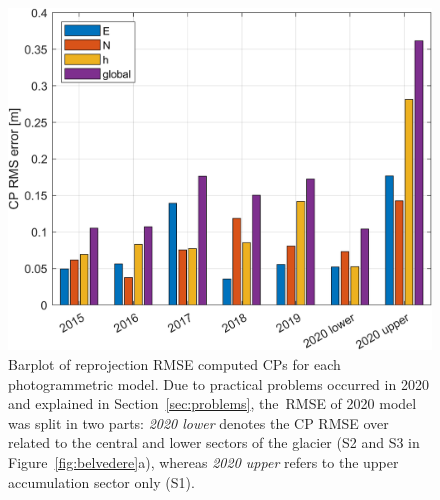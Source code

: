 \begin{figure}
	\centering
	\includegraphics[width=0.7\columnwidth]{figures/chapter3/CPrmse.png}
	\caption{Barplot of reprojection RMSE computed CPs for each photogrammetric model. Due to practical problems occurred in 2020 and explained in Section~\ref{sec:problems}, the~RMSE of 2020 model was split in two parts: \textit{2020 lower} denotes the CP RMSE over related to the central and lower sectors of the glacier (S2 and S3 in Figure~\ref{fig:belvedere}a), whereas \textit{2020 upper} refers to the upper accumulation sector only (S1).}
	\label{fig:CP_errors}
\end{figure}

